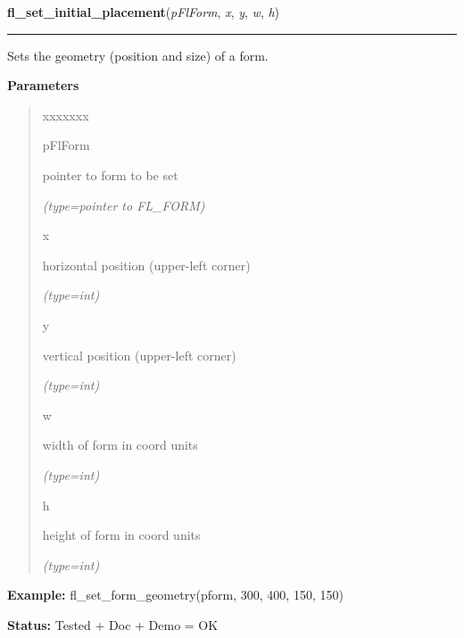     \label{xformslib:flbasic:fl_set_form_geometry}

    \vspace{0.5ex}

\hspace{.8\funcindent}\begin{boxedminipage}{\funcwidth}

    \raggedright \textbf{fl\_set\_initial\_placement}(\textit{pFlForm}, \textit{x}, \textit{y}, \textit{w}, \textit{h})

    \vspace{-1.5ex}

    \rule{\textwidth}{0.5\fboxrule}
\setlength{\parskip}{2ex}
    Sets the geometry (position and size) of a form.

\setlength{\parskip}{1ex}
      \textbf{Parameters}
      \vspace{-1ex}

      \begin{quote}
        \begin{Ventry}{xxxxxxx}

          \item[pFlForm]

          pointer to form to be set

            {\it (type=pointer to FL\_FORM)}

          \item[x]

          horizontal position (upper-left corner)

            {\it (type=int)}

          \item[y]

          vertical position (upper-left corner)

            {\it (type=int)}

          \item[w]

          width of form in coord units

            {\it (type=int)}

          \item[h]

          height of form in coord units

            {\it (type=int)}

        \end{Ventry}

      \end{quote}

\textbf{Example:} fl\_set\_form\_geometry(pform, 300, 400, 150, 150)



\textbf{Status:} Tested + Doc + Demo = OK



    \end{boxedminipage}


